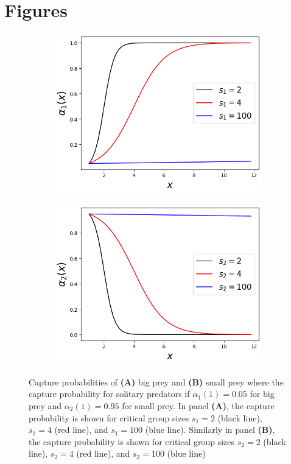 \section{Figures}
\begin{figure}[htbp]
\centering
\begin{subfigure}[b]{.4\textwidth}
	\centering
	\caption{}
	\includegraphics[width=\textwidth]{Figures/capturerate_bigprey.png}
	\label{capture_rates_big}
\end{subfigure}
\begin{subfigure}[b]{.4\textwidth}
	\centering{}
	\caption{}
	\includegraphics[width=\textwidth]{Figures/capturerate_smallprey.png}
	\label{capture_rates_small}
\end{subfigure}
\caption{Capture probabilities of \textbf{(A)} big prey and \textbf{(B)} small prey where the capture probability for solitary predators if $\alpha_1(1)= 0.05$ for big prey and $\alpha_2(1) = 0.95$ for small prey. In panel \textbf{(A)}, the capture probability is shown for critical group sizes $s_1 = 2$ (black line), $s_1 = 4$ (red line), and $s_1 = 100$ (blue line). Similarly in panel \textbf{(B)}, the capture probability is shown for critical group sizes $s_2 = 2$ (black line), $s_2 = 4$ (red line), and $s_2 = 100$ (blue line)}
\label{default}
\end{figure}